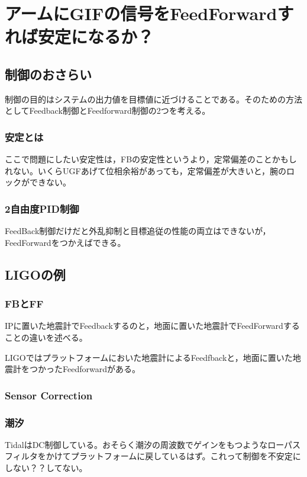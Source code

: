 \abstract{}


\section{アームにGIFの信号をFeedForwardすれば安定になるか？}

\subsection{制御のおさらい}
制御の目的はシステムの出力値を目標値に近づけることである。そのための方法としてFeedback制御とFeedforward制御の2つを考える。
\subsubsection{安定とは}
ここで問題にしたい安定性は，FBの安定性というより，定常偏差のことかもしれない。いくらUGFあげて位相余裕があっても，定常偏差が大きいと，腕のロックができない。

\subsubsection{2自由度PID制御}

FeedBack制御だけだと外乱抑制と目標追従の性能の両立はできないが，FeedForwardをつかえばできる\cite{araki2003two}。


\subsection{LIGOの例}
\subsubsection{FBとFF}
IPに置いた地震計でFeedbackするのと，地面に置いた地震計でFeedForwardすることの違いを述べる。

LIGOではプラットフォームにおいた地震計によるFeedfbackと，地面に置いた地震計をつかったFeedforwardがある。

\subsubsection{Sensor Correction}



\subsubsection{潮汐}
TidalはDC制御している。おそらく潮汐の周波数でゲインをもつようなローパスフィルタをかけてプラットフォームに戻しているはず。これって制御を不安定にしない？？してない。


